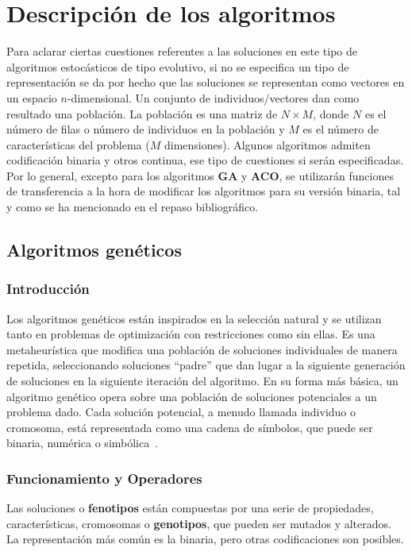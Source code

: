 \chapter{Descripción de los algoritmos}
Para aclarar ciertas cuestiones referentes a las soluciones en este tipo de algoritmos estocásticos de tipo evolutivo, si no se especifica un tipo de representación se da por hecho que las soluciones se representan como vectores en un espacio $n$-dimensional. Un conjunto de individuos/vectores dan como resultado una población. La población es una matriz de $N\times M$, donde $N$ es el número de filas o número de individuos en la población y $M$ es el número de características del problema ($M$ dimensiones). Algunos algoritmos admiten codificación binaria y otros continua, ese tipo de cuestiones si serán especificadas.\\[6pt]
Por lo general, excepto para los algoritmos \textbf{GA} y \textbf{ACO}, se utilizarán funciones de transferencia a la hora de modificar los algoritmos para su versión binaria, tal y como se ha mencionado en el repaso bibliográfico.
\section{Algoritmos genéticos}
\subsection{Introducción}
Los algoritmos genéticos están inspirados en la selección natural y se utilizan tanto en problemas de optimización con restricciones como sin ellas. Es una metaheurística que modifica una población de soluciones individuales de manera repetida, seleccionando soluciones ``padre'' que dan lugar a la siguiente generación de soluciones en la siguiente iteración del algoritmo. En su forma más básica, un algoritmo genético opera sobre una población de soluciones potenciales a un problema dado. Cada solución potencial, a menudo llamada individuo o cromosoma, está representada como una cadena de símbolos, que puede ser binaria, numérica o simbólica~\cite{10.5555/522098}.

\subsection{Funcionamiento y Operadores}
Las soluciones o \textbf{fenotipos} están compuestas por una serie de propiedades, características, cromosomas o \textbf{genotipos}, que pueden ser mutados y alterados. La representación más común es la binaria, pero otras codificaciones son posibles.

